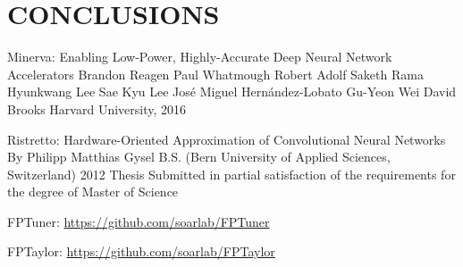 \documentclass[letterpaper, 10 pt, conference]{ieeeconf}
\begin{document}
\section{CONCLUSIONS}

\begin{thebibliography}{99}

 Minerva: Enabling Low-Power, Highly-Accurate
Deep Neural Network Accelerators
Brandon Reagen Paul Whatmough Robert Adolf Saketh Rama
Hyunkwang Lee Sae Kyu Lee José Miguel Hernández-Lobato
Gu-Yeon Wei David Brooks
Harvard University, 2016 

 Ristretto: Hardware-Oriented Approximation of Convolutional Neural Networks
By Philipp Matthias Gysel B.S. (Bern University of Applied Sciences, Switzerland) 2012
Thesis Submitted in partial satisfaction of the requirements for the degree of
Master of Science

 FPTuner: \url{https://github.com/soarlab/FPTuner}

 FPTaylor: \url{https://github.com/soarlab/FPTaylor}

\end{thebibliography}
\end{document}
